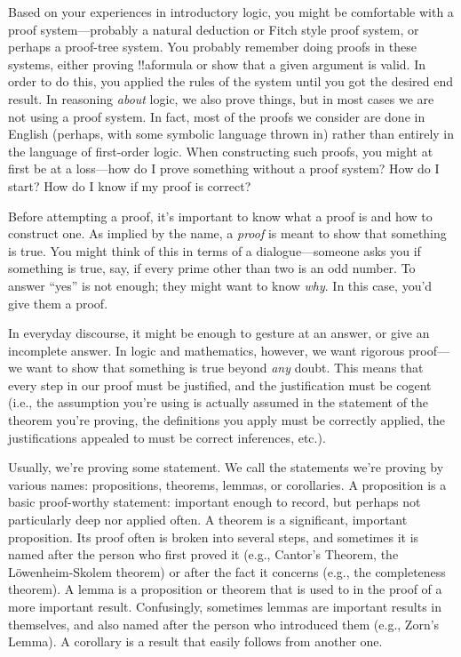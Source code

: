 \documentclass[../../../include/open-logic-section]{subfiles}
\begin{document}


Based on your experiences in introductory logic, you might be
comfortable with a proof system---probably a natural deduction or
Fitch style proof system, or perhaps a proof-tree system. You probably
remember doing proofs in these systems, either proving !!a{formula}
or show that a given argument is valid. In order to do this, you
applied the rules of the system until you got the desired end
result. In reasoning \emph{about} logic, we also prove things, but in
most cases we are not using a proof system. In fact, most of the
proofs we consider are done in English (perhaps, with some symbolic
language thrown in) rather than entirely in the language of
first-order logic.  When constructing such proofs, you might at first
be at a loss---how do I prove something without a proof system?  How
do I start? How do I know if my proof is correct?

Before attempting a proof, it's important to know what a proof is and
how to construct one.  As implied by the name, a \emph{proof} is meant
to show that something is true. You might think of this in terms of a
dialogue---someone asks you if something is true, say, if every prime
other than two is an odd number. To answer ``yes'' is not enough; they
might want to know \emph{why}. In this case, you'd give them a proof.

In everyday discourse, it might be enough to gesture at an answer, or
give an incomplete answer. In logic and mathematics, however, we want
rigorous proof---we want to show that something is true beyond \emph{any}
doubt. This means that every step in our proof must be justified, and
the justification must be cogent (i.e., the assumption you're using is
actually assumed in the statement of the theorem you're proving, the
definitions you apply must be correctly applied, the justifications
appealed to must be correct inferences, etc.).

Usually, we're proving some statement. We call the statements we're
proving by various names: propositions, theorems, lemmas, or
corollaries.  A proposition is a basic proof-worthy statement:
important enough to record, but perhaps not particularly deep nor
applied often. A theorem is a significant, important proposition. Its
proof often is broken into several steps, and sometimes it is named
after the person who first proved it (e.g., Cantor's Theorem, the
L\"owenheim-Skolem theorem) or after the fact it concerns (e.g., the
completeness theorem).  A lemma is a proposition or theorem that is
used to in the proof of a more important result. Confusingly,
sometimes lemmas are important results in themselves, and also named
after the person who introduced them (e.g., Zorn's Lemma). A corollary
is a result that easily follows from another one.
\end{document}
